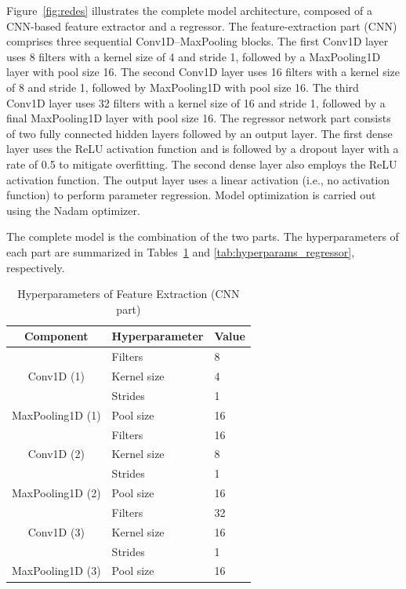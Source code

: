 \documentclass[10pt,conference]{IEEEtran}
\begin{document}
Figure~\ref{fig:redes} illustrates the complete model architecture, composed of a CNN-based feature extractor and a regressor.
The feature-extraction part (CNN) comprises three sequential Conv1D–MaxPooling blocks. The first Conv1D layer uses 8 filters with a kernel size of 4 and stride 1, followed by a MaxPooling1D layer with pool size 16. The second Conv1D layer uses 16 filters with a kernel size of 8 and stride 1, followed by MaxPooling1D with pool size 16. The third Conv1D layer uses 32 filters with a kernel size of 16 and stride 1, followed by a final MaxPooling1D layer with pool size 16.
The regressor network part consists of two fully connected hidden layers followed by an output layer. The first dense layer uses the ReLU activation function and is followed by a dropout layer with a rate of 0.5 to mitigate overfitting. The second dense layer also employs the ReLU activation function. The output layer uses a linear activation (i.e., no activation function) to perform parameter regression. Model optimization is carried out using the Nadam optimizer.

The complete model is the combination of the two parts. The hyperparameters of each part are summarized in Tables~\ref{tab:hyperparams_cnn} and \ref{tab:hyperparams_regressor}, respectively.

\begin{table} \small \centering
  \caption{Hyperparameters of Feature Extraction (CNN part)}
  \label{tab:hyperparams_cnn}
  \begin{tabular}{cll}
    \toprule
    Component & Hyperparameter & Value \\
    \midrule
    \multirow{3}{*}{Conv1D (1)} 
        & Filters & 8 \\
        & Kernel size & 4 \\
        & Strides & 1 \\
    MaxPooling1D (1) & Pool size & 16 \\
    \multirow{3}{*}{Conv1D (2)} 
        & Filters & 16 \\
        & Kernel size & 8 \\
        & Strides & 1 \\
    MaxPooling1D (2) & Pool size & 16 \\
    \multirow{3}{*}{Conv1D (3)} 
        & Filters & 32 \\
        & Kernel size & 16 \\
        & Strides & 1 \\
    MaxPooling1D (3) & Pool size & 16 \\
    \bottomrule
  \end{tabular}
\end{table}
\end{document}
